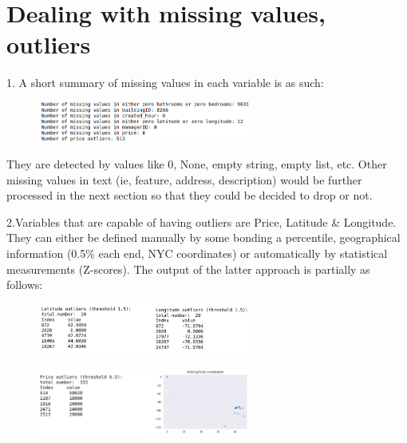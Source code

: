 \documentclass[10pt,twocolumn,letterpaper]{article}
\begin{document}






\section{Dealing with missing values, outliers}

1. A short summary of missing values in each variable is as such:


\begin{figure}[h!]
    \centering
    \includegraphics[width=7cm]{CMPT459_9.png}
    \caption{}
    \label{fig:galaxy}
\end{figure}

They are detected by values like 0, None, empty string, empty list, etc. Other missing values in text (ie, feature, address, description) would be further processed in the next section so that they could be decided to drop or not.

\-

2.Variables that are capable of having outliers are Price, Latitude & Longitude. They can either be defined manually by some bonding a percentile, geographical information (0.5\% each end, NYC coordinates) or automatically by statistical measurements (Z-scores). The output of the latter approach is partially as follows: 


\begin{figure}[h!]
    \centering
    \includegraphics[width=7cm]{CMPT459_pair3.png}
    \caption{}
    \label{fig:galaxy}
\end{figure}


\begin{figure}[h!]
    \centering
    \includegraphics[width=7cm]{CMPT459_pair4.png}
    \caption{}
    \label{fig:galaxy}
\end{figure}
\end{document}
